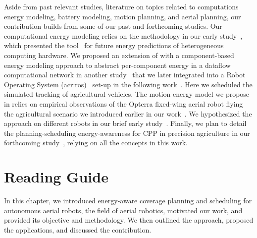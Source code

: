 Aside from past relevant studies, literature on topics related to computations energy modeling, battery modeling, motion planning, and aerial planning, our contribution builds from some of our past and forthcoming studies. Our computational energy modeling relies on the methodology in our early study~\citep{seewald2019coarse}, which presented the \powprof{} tool~\citep{powprofiler} for future energy predictions of heterogeneous computing hardware. We proposed an extension of \powprof{} with a component-based energy modeling approach to abstract per-component energy in a dataflow computational network in another study~\citep{seewald2019component} that we later integrated into a Robot Operating System (\Gls{acr:ros})~\citep{quigley2009ros} set-up in the following work~\citep{zamanakos2020energy}. Here we scheduled the simulated tracking of agricultural vehicles. The motion energy model we propose in  relies on empirical observations of the Opterra fixed-wing aerial robot flying the agricultural scenario we introduced earlier in our work~\citep{seewald2020mechanical}. We hypothesized the approach on different robots in our brief early study~\citep{seewald2020beyond}. Finally, we plan to detail the planning-scheduling energy-awareness for CPP in precision agriculture in our forthcoming study~\citep{seewald202Xenergy}, relying on all the concepts in this work. 


\section{Reading Guide}
\label{sec:structure}

In this chapter, we introduced energy-aware coverage planning and scheduling for autonomous aerial robots, the field of aerial robotics, motivated our work, and provided its objective and methodology. We then outlined the approach, proposed the applications, and discussed the contribution.

